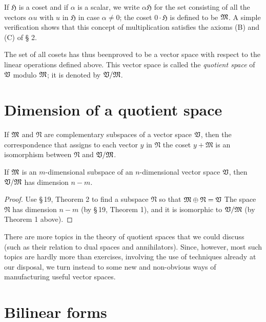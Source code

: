 If \(\mathfrak{H}\) is a coset and if \(\alpha\) is a scalar, we write \(\alpha
\mathfrak{H}\) for the set consisting of all the vectors \(\alpha u\) with \(u\) in
\(\mathfrak{H}\) in case \(\alpha \neq 0\); the coset \(0 \cdot \mathfrak{H}\) is
defined to be \(\mathfrak{M}\). A simple verification shows that this concept of
multiplication satisfies the axioms (B) and (C) of § 2.

The set of all cosets has thus beenproved to be a vector space with respect to
the linear operations defined above. This vector space is called the
\emph{quotient space} of \(\mathfrak{V}\) modulo \(\mathfrak{M}\); it is denoted by \(\mathfrak{V}
/ \mathfrak{M}\).

\section{Dimension of a quotient space}

\begin{theorem}
    If \(\mathfrak{M}\) and \(\mathfrak{N}\) are complementary subspaces of a vector space
    \(\mathfrak{V}\), then the correspondence that assigns to each vector \(y\) in
    \(\mathfrak{N}\) the coset \(y + \mathfrak{M}\) is an isomorphism between
    \(\mathfrak{N}\) and \(\mathfrak{V} / \mathfrak{M}\).
\end{theorem}

\begin{theorem}
    If \(\mathfrak{M}\) is an \(m\)-dimensional subspace of an \(n\)-dimensional vector space \(\mathfrak{V}\), then \(\mathfrak{V} / \mathfrak{M}\) has dimension \(n - m\).
\end{theorem}

\begin{proof} 
    Use §\,19, Theorem 2 to find a subspace \(\mathfrak{N}\) so that \(\mathfrak{M} \oplus
    \mathfrak{N} = \mathfrak{V}\) The space \(\mathfrak{N}\) has dimension \(n - m\) (by §\,19,
    Theorem 1), and it is isomorphic to \(\mathfrak{V} / \mathfrak{M}\) (by Theorem 1
    above).
\end{proof}

There are more topics in the theory of quotient spaces that we could discuss
(such as their relation to dual spaces and annihilators). Since, however, most
such topics are hardly more than exercises, involving the use of techniques
already at our disposal, we turn instead to some new and non-obvious ways of
manufacturing useful vector spaces.

\section{Bilinear forms}

